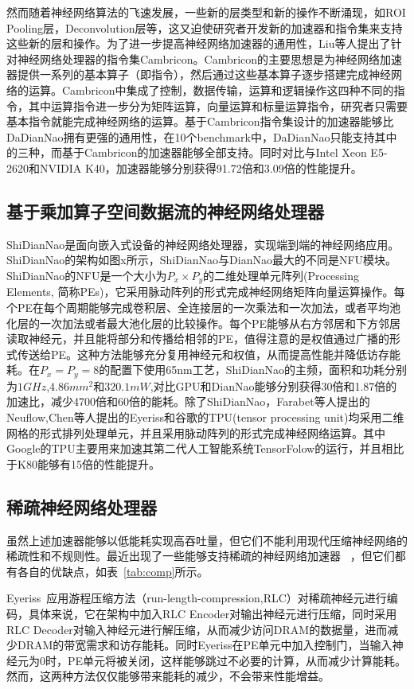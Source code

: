 然而随着神经网络算法的飞速发展，一些新的层类型和新的操作不断涌现，如ROI Pooling层，Deconvolution层等，这又迫使研究者开发新的加速器和指令集来支持这些新的层和操作。为了进一步提高神经网络加速器的通用性，Liu等人提出了针对神经网络处理器的指令集Cambricon。Cambricon的主要思想是为神经网络加速器提供一系列的基本算子（即指令），然后通过这些基本算子逐步搭建完成神经网络的运算。Cambricon中集成了控制，数据传输，运算和逻辑操作这四种不同的指令，其中运算指令进一步分为矩阵运算，向量运算和标量运算指令，研究者只需要基本指令就能完成神经网络的运算。基于Cambricon指令集设计的加速器能够比DaDianNao拥有更强的通用性，在10个benchmark中，DaDianNao只能支持其中的三种，而基于Cambricon的加速器能够全部支持。同时对比与Intel Xeon E5-2620和NVIDIA K40，加速器能够分别获得91.72倍和3.09倍的性能提升。

\subsection{基于乘加算子空间数据流的神经网络处理器}
ShiDianNao是面向嵌入式设备的神经网络处理器，实现端到端的神经网络应用。ShiDianNao的架构如图x所示，ShiDianNao与DianNao最大的不同是NFU模块。ShiDianNao的NFU是一个大小为$P_x\times P_y$的二维处理单元阵列(Processing Elements, 简称PEs)，它采用脉动阵列的形式完成神经网络矩阵向量运算操作。每个PE在每个周期能够完成卷积层、全连接层的一次乘法和一次加法，或者平均池化层的一次加法或者最大池化层的比较操作。每个PE能够从右方邻居和下方邻居读取神经元，并且能将部分和传播给相邻的PE，值得注意的是权值通过广播的形式传送给PE。这种方法能够充分复用神经元和权值，从而提高性能并降低访存能耗。在$P_x=P_y=8$的配置下使用65nm工艺，ShiDianNao的主频，面积和功耗分别为$1GHz$,$4.86mm^2$和$320.1mW$,对比GPU和DianNao能够分别获得30倍和1.87倍的加速比，减少4700倍和60倍的能耗。除了ShiDianNao，Farabet等人提出的Neuflow,Chen等人提出的Eyeriss和谷歌的TPU(tensor processing unit)均采用二维网格的形式排列处理单元，并且采用脉动阵列的形式完成神经网络运算。其中Google的TPU主要用来加速其第二代人工智能系统TensorFolow的运行，并且相比于K80能够有15倍的性能提升。


\subsection{稀疏神经网络处理器}
虽然上述加速器能够以低能耗实现高吞吐量，但它们不能利用现代压缩神经网络的稀疏性和不规则性。最近出现了一些能够支持稀疏的神经网络加速器~\cite{chen2017eyeriss,zhang2016cambricon,albericio2016cnvlutin,han2016eie,han2017ese,angshuman2017scnn}
，但它们都有各自的优缺点，如表~\ref{tab:comp}所示。

Eyeriss~\cite{chen2017eyeriss}应用游程压缩方法（run-length-compression,RLC）对稀疏神经元进行编码，具体来说，它在架构中加入RLC Encoder对输出神经元进行压缩，同时采用RLC Decoder对输入神经元进行解压缩，从而减少访问DRAM的数据量，进而减少DRAM的带宽需求和访存能耗。同时Eyeriss在PE单元中加入控制门，当输入神经元为0时，PE单元将被关闭，这样能够跳过不必要的计算，从而减少计算能耗。然而，这两种方法仅仅能够带来能耗的减少，不会带来性能增益。

